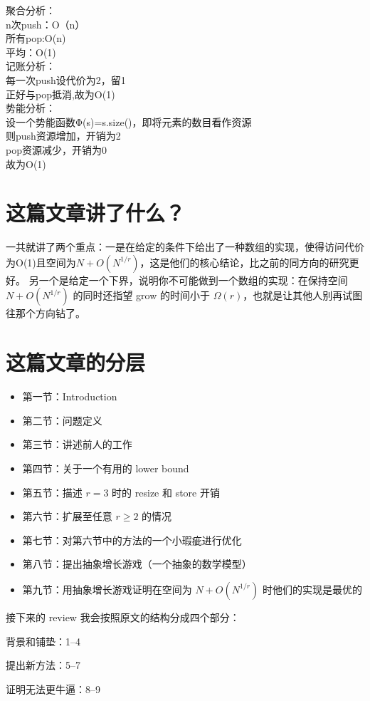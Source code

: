 \documentclass[12pt,a4paper]{article}
\begin{document}
聚合分析：\\
n次push：O（n）\\
所有pop:O(n)\\
平均：O(1)\\
记账分析：\\
每一次push设代价为2，留1\\
正好与pop抵消,故为O(1)\\
势能分析：\\
设一个势能函数Φ(s)=s.size()，即将元素的数目看作资源\\
则push资源增加，开销为2\\
pop资源减少，开销为0\\
故为O(1)\\
\section{这篇文章讲了什么？}
一共就讲了两个重点：一是在给定的条件下给出了一种数组的实现，使得访问代价为O(1)且空间为$N+O(N^{1/r})$，这是他们的核心结论，比之前的同方向的研究更好。
另一个是给定一个下界，说明你不可能做到一个数组的实现：在保持空间 $N+O(N^{1/r})$ 的同时还指望 grow 的时间小于 $\Omega(r)$，也就是让其他人别再试图往那个方向钻了。
\section{这篇文章的分层}
\begin{itemize}[left=0pt]
    \item 第一节：Introduction
    \item 第二节：问题定义
    \item 第三节：讲述前人的工作
    \item 第四节：关于一个有用的 lower bound
    \item 第五节：描述 $r=3$ 时的 resize 和 store 开销
    \item 第六节：扩展至任意 $r\ge2$ 的情况
    \item 第七节：对第六节中的方法的一个小瑕疵进行优化
    \item 第八节：提出抽象增长游戏（一个抽象的数学模型）
    \item 第九节：用抽象增长游戏证明在空间为 $N+O(N^{1/r})$ 时他们的实现是最优的
\end{itemize}

接下来的 review 我会按照原文的结构分成四个部分：

背景和铺垫：1--4

提出新方法：5--7

证明无法更牛逼：8--9
\end{document}
